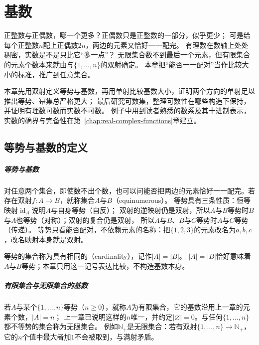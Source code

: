 \chapter{基数}
\label{chap:cardinality}

正整数与正偶数，哪一个更多？正偶数只是正整数的一部分，似乎更少；
可是给每个正整数$n$配上正偶数$2n$，两边的元素又恰好一一配完。
有理数在数轴上处处稠密，实数是不是只比它“多一点”？
无限集合数不到最后一个元素，但有限集合的元素个数本来就由与$\{1,\ldots,n\}$的双射确定。
本章把“能否一一配对”当作比较大小的标准，推广到任意集合。

本章先用双射定义等势与基数，再用单射比较基数大小，证明两个方向的单射足以推出等势、幂集总严格更大；
最后研究可数集，整理可数性在哪些构造下保持，并证明有理数可数而实数不可数。
例子中用到读者熟悉的数系及其十进制表示，实数的确界与完备性在第~\ref{chap:real-complex-functions}章建立。

\section{等势与基数的定义}
\label{sec:comb-cardinality}
\label{sec:comb-equinumerosity-cardinality}

\paragraph{等势与基数}
对任意两个集合，即使数不出个数，也可以问能否把两边的元素恰好一一配完。若存在双射$f:A\to B$，就称集合$A$与$B$（equinumerous）。
等势具有三条性质：恒等映射$\operatorname{id}_A$说明$A$与自身等势（自反）；
双射的逆映射仍是双射，所以$A$与$B$等势时$B$与$A$也等势（对称）；双射的复合仍是双射，
所以$A$与$B$、$B$与$C$等势时$A$与$C$等势（传递）。
等势只看能否配对，不依赖元素的名称：把$\{1,2,3\}$的元素改名为$a,b,c$，改名映射本身就是双射。

等势的集合称为具有相同的（cardinality），记作$|A|=|B|$。
$|A|=|B|$恰好意味着$A$与$B$等势；本章只用这一记号表达比较，不构造基数本身。

\paragraph{有限集合与无限集合的基数}
若$A$与某个$\{1,\ldots,n\}$等势（$n\geq0$），就称$A$为有限集合，它的基数沿用上一章的元素个数，$|A|=n$；
上一章已说明这样的$n$唯一，并约定$|\varnothing|=0$。与任何$\{1,\ldots,n\}$都不等势的集合称为无限集合。
例如$\mathbb N_+$是无限集合：若有双射$\{1,\ldots,n\}\to\mathbb N_+$，它的$n$个值中最大者加$1$不会被取到，与满射矛盾。

